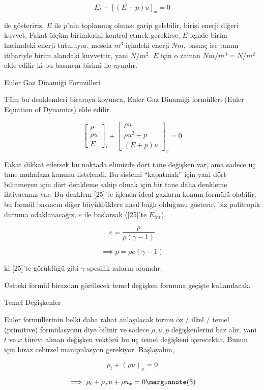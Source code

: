\documentclass[12pt,fleqn]{article}\usepackage{../../common}
\begin{document}
$$
E_t + [(E + p) u ]_x = 0
$$

ile gösteririz. $E$ ile $p$'nin toplanmış olması garip gelebilir, birisi enerji
diğeri kuvvet. Fakat ölçüm birimlerini kontrol etmek gerekirse, $E$ içinde birim
hacimdeki enerji tutuluyor, mesela $m^3$ içindeki enerji $N m$, basınç ise tanım
itibariyle birim alandaki kuvvettir, yani $N / m^2$. $E$ için o zaman
$N m / m^3 = N / m^2$ elde edilir ki bu basıncın birimi ile aynıdır.

Euler Gaz Dinamiği Formülleri

Tüm bu denklemleri biraraya koyunca, Euler Gaz Dinamiği formülleri (Euler
Equation of Dynamics) elde edilir.

$$
\left[\begin{array}{c}
\rho \\ \rho u  \\ E
\end{array}\right]_t
+
\left[\begin{array}{c}
\rho u \\ \rho u^2 + p \\ (E+p) u 
\end{array}\right]_x 
= 0
$$

Fakat dikkat edersek bu noktada elimizde dört tane değişken var, ama sadece üç
tane muhafaza kanunu listelendi. Bu sistemi ``kapatmak'' için yani dört
bilinmeyen için dört denkleme sahip olmak için bir tane daha denkleme
ihtiyacımız var. Bu denklem [25]'te işlenen ideal gazların konum formülü
olabilir, bu formül basıncın diğer büyüklüklere nasıl bağlı olduğunu gösterir,
biz politropik duruma odaklanacağız, $e$ ile baslarsak ([25]'te $E_{int}$),

$$
e = \frac{p}{\rho (\gamma - 1)}
$$

$$
\implies p = \rho e (\gamma - 1)
$$

ki [25]'te görüldüğü gibi $\gamma$ spesifik ısıların oranıdır.

Üstteki formül birazdan görülecek temel değişken formuna geçişte kullanılacak.

Temel Değişkenler

Euler formüllerinin belki daha rahat anlaşılacak formu öz / ilkel / temel
(primitive) formülasyonu diye bilinir ve sadece $\rho,u,p$ değişkenlerini baz
alır, yani $t$ ve $x$ türevi alınan değişken vektörü bu üç temel değişkeni
içerecektir. Bunun için biraz cebirsel manipulasyon gerekiyor. Başlayalım,

$$
\rho_t + (\rho u)_x = 0 
$$

$$
\implies \rho_t + \rho_x u + \rho u_x = 0
\mlabel{3}
$$
\end{document}
